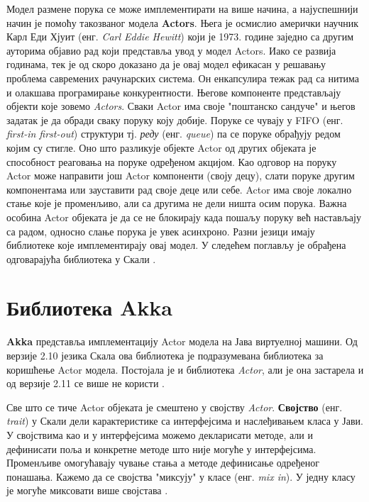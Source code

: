 \documentclass[12pt,oneside]{memoir}
\begin{document}
Модел размене порука се може имплементирати на више начина, а најуспешнији начин је помоћу такозваног модела \textbf{Actors}. Њега је осмислио амерички научник Карл Еди Хјуит (енг. \textit{Carl Eddie Hewitt}) који је 1973. године заједно са другим ауторима објавио рад који представља увод у модел Actors. Иако се развија годинама, тек је од скоро доказано да је овај модел ефикасан у решавању проблема савремених рачунарских система. Он енкапсулира тежак рад са нитима и олакшава програмирање конкурентности. Његове компоненте представљају објекти које зовемо \textit{Actors}. Сваки Actor има своје "поштанско сандуче" и његов задатак је да обради сваку поруку коју добије. Поруке се чувају у FIFO (енг. \textit{first-in first-out}) структури тј. \textit{реду} (енг. \textit{queue}) па се поруке обрађују редом којим су стигле. Оно што разликује објекте Actor од других објеката је способност реаговања на поруке одређеном акцијом. Као одговор на поруку Actor може направити још Actor компоненти (своју децу), слати поруке другим компонентама или зауставити рад своје деце или себе. Actor има своје локално стање које је променљиво, али са другима не дели ништа осим порука. Важна особина Actor објеката је да се не блокирају када пошаљу поруку већ настављају са радом, односно слање порука је увек асинхроно. Разни језици имају библиотеке које имплементирају овај модел. У следећем поглављу је обрађена одговарајућа библиотека у Скали \cite{progInScala3, carlHewittActor, seven}.

\section{Библиотека Akka}
\label{sec:akka}

\textbf{Akka} представља имплементацију Actor модела на Јава виртуелној машини. Од верзије 2.10 језика Скала ова библиотека је подразумевана библиотека за коришћење Actor модела. Постојала је и библиотека \textit{Actor}, али је она застарела и од верзије 2.11 се више не користи \cite{akkaMarius}.

Све што се тиче Actor објеката је смештено у својству \textit{Actor}. \textbf{Својство} (енг. \textit{trait}) у Скали дели карактеристике са интерфејсима и наслеђивањем класа у Јави. У својствима као и у интерфејсима можемо декларисати методе, али и дефинисати поља и конкретне методе што није могуће у интерфејсима. Променљиве омогућавају чување стања а методе дефинисање одређеног понашања. Кажемо да се својства "миксују" у класе (енг. \textit{mix in}). У једну класу је могуће миксовати више својстава  \cite{progInScala3, progInScala}.
\end{document}
